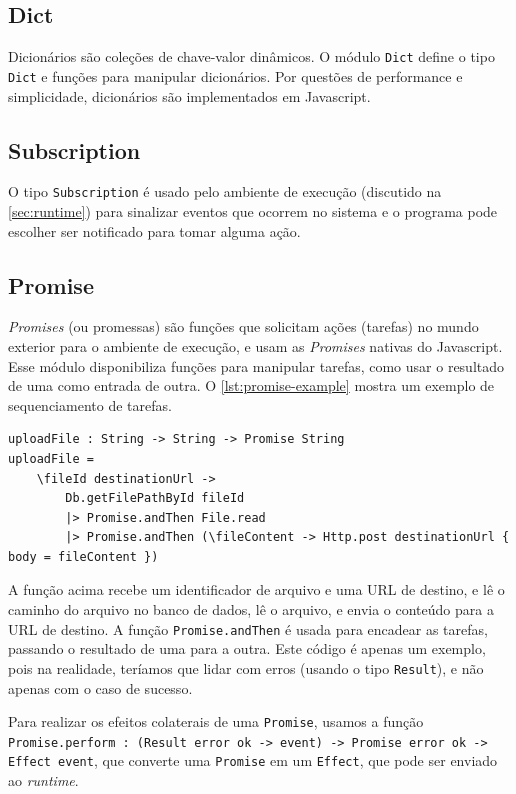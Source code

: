 \subsection{Dict}

Dicionários são coleções de chave-valor dinâmicos. O módulo \texttt{Dict} define
o tipo \texttt{Dict} e funções para manipular dicionários. Por questões de performance
e simplicidade, dicionários são implementados em Javascript.

\subsection{Subscription}

O tipo \texttt{Subscription} é usado pelo ambiente de execução (discutido na
\autoref{sec:runtime}) para sinalizar eventos que ocorrem no sistema e o programa
pode escolher ser notificado para tomar alguma ação.


\subsection{Promise}

\textit{Promises} (ou promessas) são funções que solicitam ações (tarefas) no mundo exterior para
o ambiente de execução, e usam as \textit{Promises} nativas do Javascript. Esse módulo disponibiliza
funções para manipular tarefas, como usar o resultado de uma como entrada de outra. O \autoref{lst:promise-example}
mostra um exemplo de sequenciamento de tarefas.

\begin{lstlisting}[label={lst:promise-example},caption={Exemplo de sequenciamento de tarefas}]
uploadFile : String -> String -> Promise String
uploadFile =
    \fileId destinationUrl ->
        Db.getFilePathById fileId
        |> Promise.andThen File.read
        |> Promise.andThen (\fileContent -> Http.post destinationUrl { body = fileContent })
\end{lstlisting}

A função acima recebe um identificador de arquivo e uma URL de destino, e lê
o caminho do arquivo no banco de dados, lê o arquivo, e envia o conteúdo para
a URL de destino. A função \texttt{Promise.andThen} é usada para encadear as tarefas,
passando o resultado de uma para a outra. Este código é apenas um exemplo, pois
na realidade, teríamos que lidar com erros (usando o tipo \texttt{Result}), e
não apenas com o caso de sucesso.

Para realizar os efeitos colaterais de uma \texttt{Promise}, usamos a função
\texttt{Promise.perform : (Result error ok -> event) -> Promise error ok -> Effect event},
que converte uma \texttt{Promise} em um \texttt{Effect}, que pode ser enviado ao
\textit{runtime}.

